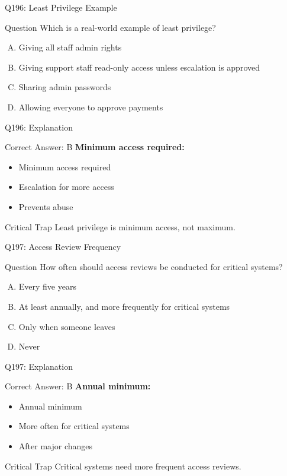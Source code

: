 \documentclass{beamer}
\begin{document}
	\begin{frame}{Q196: Least Privilege Example}
		\begin{block}{Question}
			Which is a real-world example of least privilege?
		\end{block}
		\begin{enumerate}[(A)]
			\item Giving all staff admin rights
			\item Giving support staff read-only access unless escalation is approved
			\item Sharing admin passwords
			\item Allowing everyone to approve payments
		\end{enumerate}
	\end{frame}
	
	\begin{frame}{Q196: Explanation}
		\begin{block}{Correct Answer: B}
			\textbf{Minimum access required:}
			\begin{itemize}
				\item Minimum access required
				\item Escalation for more access
				\item Prevents abuse
			\end{itemize}
		\end{block}
		\begin{alertblock}{Critical Trap}
			Least privilege is minimum access, not maximum.
		\end{alertblock}
	\end{frame}
	
	\begin{frame}{Q197: Access Review Frequency}
		\begin{block}{Question}
			How often should access reviews be conducted for critical systems?
		\end{block}
		\begin{enumerate}[(A)]
			\item Every five years
			\item At least annually, and more frequently for critical systems
			\item Only when someone leaves
			\item Never
		\end{enumerate}
	\end{frame}
	
	\begin{frame}{Q197: Explanation}
		\begin{block}{Correct Answer: B}
			\textbf{Annual minimum:}
			\begin{itemize}
				\item Annual minimum
				\item More often for critical systems
				\item After major changes
			\end{itemize}
		\end{block}
		\begin{alertblock}{Critical Trap}
			Critical systems need more frequent access reviews.
		\end{alertblock}
	\end{frame}
	
\end{document}
